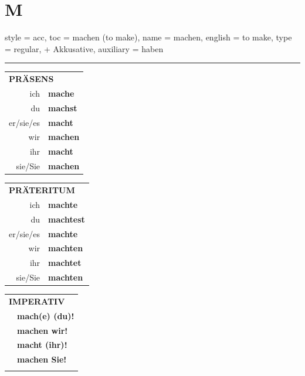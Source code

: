 \section{M}

\begin{verbentry}{
  style = {acc},
  toc = {machen (to make)},
  name = {machen},
  english = {to make},
  type = {regular, + Akkusative},
  auxiliary = {haben}
}
 
    
     \vspace{5pt}

    \hrule
    
    \vspace{5pt}

  \begin{tabular}{rl}
     \multicolumn{2}{l}{\textbf{PRÄSENS} }\\
    ich & \textbf{mache}\\
    du & \textbf{machst}\\
    er/sie/es & \textbf{macht}\\
    wir & \textbf{machen}\\
    ihr & \textbf{macht}\\
    sie/Sie & \textbf{machen}\\
  \end{tabular}
  \hfill
     \begin{tabular}{rl}
    \multicolumn{2}{l}{\textbf{PRÄTERITUM} }\\
    ich & \textbf{machte}\\
    du & \textbf{machtest}\\
    er/sie/es & \textbf{machte}\\
    wir & \textbf{machten}\\
    ihr & \textbf{machtet}\\
    sie/Sie & \textbf{machten}\\
  \end{tabular}
  \hfill
  \begin{tabular}{rl}
     \multicolumn{2}{l}{\textbf{IMPERATIV} }\\
   & \textbf{mach(e) (du)!}\\
   & \textbf{machen wir!}\\
   & \textbf{macht (ihr)!}\\
   & \textbf{machen Sie!}\\
   & \vspace{10pt}
  \end{tabular}

    \vspace{10pt}


\end{verbentry}
